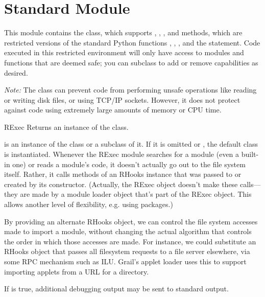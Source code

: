 \section{Standard Module }
\label{module-rexec}
\renewcommand{\indexsubitem}{(in module rexec)}

This module contains the  class, which supports
, , , and
 methods, which are restricted versions of the standard
Python functions , , , and
the  statement.
Code executed in this restricted environment will
only have access to modules and functions that are deemed safe; you
can subclass  to add or remove capabilities as desired.

\emph{Note:} The  class can prevent code from performing
unsafe operations like reading or writing disk files, or using TCP/IP
sockets.  However, it does not protect against code using extremely
large amounts of memory or CPU time.  

\begin{funcdesc}{RExec}{}
Returns an instance of the  class.  

 is an instance of the  class or a subclass of it.
If it is omitted or , the default  class is
instantiated.
Whenever the RExec module searches for a module (even a built-in one)
or reads a module's code, it doesn't actually go out to the file
system itself.  Rather, it calls methods of an RHooks instance that
was passed to or created by its constructor.  (Actually, the RExec
object doesn't make these calls---they are made by a module loader
object that's part of the RExec object.  This allows another level of
flexibility, e.g. using packages.)

By providing an alternate RHooks object, we can control the
file system accesses made to import a module, without changing the
actual algorithm that controls the order in which those accesses are
made.  For instance, we could substitute an RHooks object that passes
all filesystem requests to a file server elsewhere, via some RPC
mechanism such as ILU.  Grail's applet loader uses this to support
importing applets from a URL for a directory.

If  is true, additional debugging output may be sent to
standard output.
\end{funcdesc}

